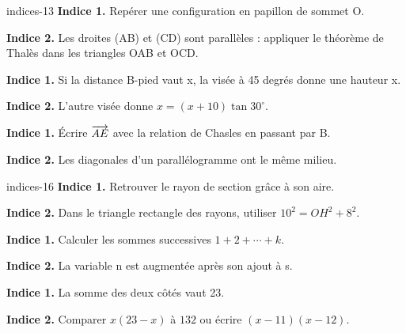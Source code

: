 \begin{blocEdition}{indices-13}
\textbf{Indice 1.} Repérer une configuration en papillon de sommet O.\par\medskip\textbf{Indice 2.} Les droites (AB) et (CD) sont parallèles : appliquer le théorème de Thalès dans les triangles OAB et OCD.\par
{}\textbf{Indice 1.} Si la distance B-pied vaut x, la visée à 45 degrés donne une hauteur x.\par\medskip\textbf{Indice 2.} L’autre visée donne $x=(x+10)\tan30^\circ$.\par
{}\textbf{Indice 1.} Écrire $\overrightarrow{AE}$ avec la relation de Chasles en passant par B.\par\medskip\textbf{Indice 2.} Les diagonales d’un parallélogramme ont le même milieu.\par

\end{blocEdition}
\begin{blocEdition}{indices-16}
\textbf{Indice 1.} Retrouver le rayon de section grâce à son aire.\par\medskip\textbf{Indice 2.} Dans le triangle rectangle des rayons, utiliser $10^2=OH^2+8^2$.\par
{}\textbf{Indice 1.} Calculer les sommes successives $1+2+\cdots+k$.\par\medskip\textbf{Indice 2.} La variable n est augmentée après son ajout à s.\par
{}\textbf{Indice 1.} La somme des deux côtés vaut 23.\par\medskip\textbf{Indice 2.} Comparer $x(23-x)$ à $132$ ou écrire $(x-11)(x-12)$.\par

\end{blocEdition}
